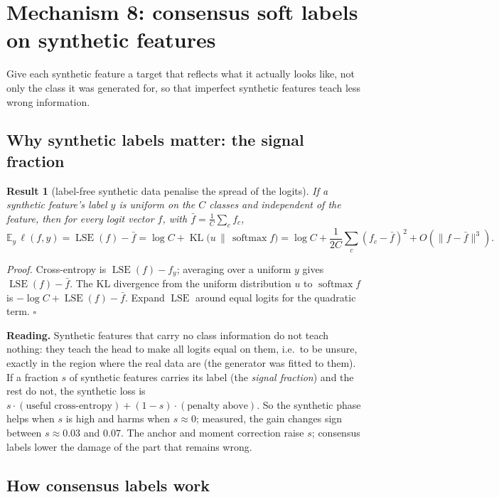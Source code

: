 \documentclass[11pt]{article}
\theoremstyle{plain}
\newtheorem{result}{Result}
\theoremstyle{definition}
\newcommand{\E}{\mathbb{E}}
\newcommand{\norm}[1]{\lVert #1\rVert}
\newcommand{\softmax}{\operatorname{softmax}}
\newcommand{\LSE}{\operatorname{LSE}}
\newcommand{\KL}{\operatorname{KL}}
\begin{document}
\section{Mechanism 8: consensus soft labels on synthetic features}\label{sec:csl}

\begin{purpose}
Give each synthetic feature a target that reflects what it actually looks like, not only the class it was generated
for, so that imperfect synthetic features teach less wrong information.
\end{purpose}

\subsection{Why synthetic labels matter: the signal fraction}

\begin{result}[label-free synthetic data penalise the spread of the logits]\label{res:logitvar}
If a synthetic feature's label $y$ is uniform on the $C$ classes and independent of the feature, then for every logit
vector $f$, with $\bar f=\frac1C\sum_cf_c$,
\[
\E_y\,\ell(f,y)=\LSE(f)-\bar f=\log C+\KL\big(u\,\|\,\softmax f\big)=\log C+\frac1{2C}\sum_c(f_c-\bar f)^2+O(\norm{f-\bar f}^3).
\]
\end{result}
\emph{Proof.} Cross-entropy is $\LSE(f)-f_y$; averaging over a uniform $y$ gives $\LSE(f)-\bar f$. The KL divergence
from the uniform distribution $u$ to $\softmax f$ is $-\log C+\LSE(f)-\bar f$. Expand $\LSE$ around equal logits for the
quadratic term. $\square$

\textbf{Reading.} Synthetic features that carry no class information do not teach nothing: they teach the head to make
all logits equal on them, i.e.\ to be unsure, exactly in the region where the real data are (the generator was fitted
to them). If a fraction $s$ of synthetic features carries its label (the \emph{signal fraction}) and the rest do not,
the synthetic loss is $s\cdot(\text{useful cross-entropy})+(1-s)\cdot(\text{penalty above})$. So the synthetic phase
helps when $s$ is high and harms when $s\approx0$; measured, the gain changes sign between $s\approx0.03$ and $0.07$.
The anchor and moment correction raise $s$; consensus labels lower the damage of the part that remains wrong.

\subsection{How consensus labels work}
\end{document}
